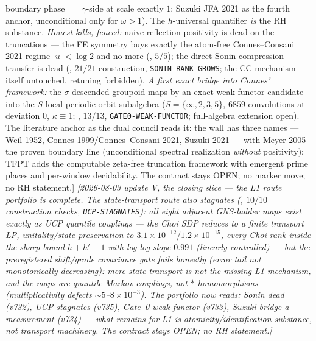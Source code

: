 {boundary phase $=$ $\gamma$-side at scale exactly $1$; Suzuki JFA
2021 as the fourth anchor, unconditional only for $\omega>1$).  The
$h$-universal quantifier \emph{is} the RH substance.  \emph{Honest
kills, fenced:} naive reflection positivity is dead on the
truncations --- the FE symmetry buys exactly the atom-free
Connes--Consani 2021 regime $|u|<\log2$ and no more
(, $5/5$); the direct
Sonin-compression transfer is dead
(, $21/21$ construction,
\texttt{SONIN-RANK-GROWS}; the CC mechanism itself untouched,
retuning forbidden).  \emph{A first exact bridge into Connes'
framework:} the $\sigma$-descended groupoid maps by an exact weak
functor candidate into the $S$-local periodic-orbit subalgebra
($S=\{\infty,2,3,5\}$, $6859$ convolutions at deviation $0$,
$\kappa\equiv1$; , $13/13$,
\texttt{GATE0-WEAK-FUNCTOR}; full-algebra extension open).  The
literature anchor as the dual council reads it: the wall has three
names --- Weil 1952, Connes 1999$/$Connes--Consani 2021, Suzuki
2021 --- with Meyer 2005 the proven boundary line (unconditional
spectral realization \emph{without} positivity); TFPT adds the
computable zeta-free truncation framework with emergent prime
places and per-window decidability.  The contract stays OPEN; no
marker move; no RH statement.]}
\emph{[2026-08-03 update V, the closing slice --- the L1 route
portfolio is complete.  The state-transport route also stagnates
(, $10/10$ construction
checks, \texttt{UCP-STAGNATES}): all eight adjacent GNS-ladder maps
exist \emph{exactly} as UCP quantile couplings --- the Choi SDP
reduces to a finite transport LP, unitality/state preservation to
$3.1\times10^{-12}/1.2\times10^{-15}$, every Choi rank inside the
sharp bound $h+h'-1$ with log-log slope $0.991$ (linearly
controlled) --- but the preregistered shift/grade covariance gate
fails honestly (error tail not monotonically decreasing): mere
state transport is \emph{not} the missing L1 mechanism, and the
maps are quantile Markov couplings, not $*$-homomorphisms
(multiplicativity defects ${\sim}5$--$8\times10^{-3}$).  The
portfolio now reads: Sonin dead (v732), UCP stagnates (v735),
Gate~0 weak functor (v733), Suzuki bridge a measurement (v734) ---
what remains for L1 is atomicity/identification substance, not
transport machinery.  The contract stays OPEN; no RH statement.]}

